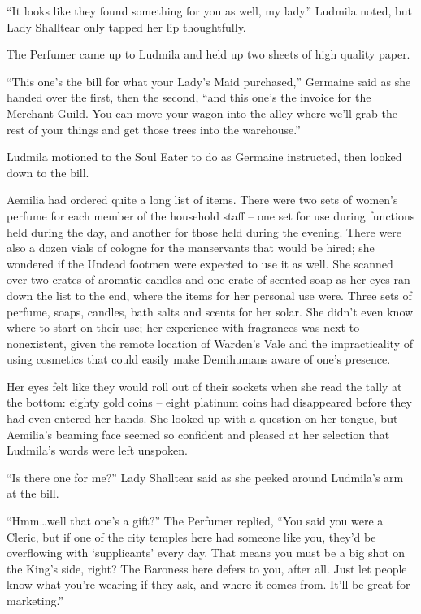  

“It looks like they found something for you as well, my lady.” Ludmila noted, but Lady Shalltear only tapped her lip thoughtfully.

 

The Perfumer came up to Ludmila and held up two sheets of high quality paper.

 

“This one’s the bill for what your Lady’s Maid purchased,” Germaine said as she handed over the first, then the second, “and this one’s the invoice for the Merchant Guild. You can move your wagon into the alley where we’ll grab the rest of your things and get those trees into the warehouse.”

 

Ludmila motioned to the Soul Eater to do as Germaine instructed, then looked down to the bill.

 

Aemilia had ordered quite a long list of items. There were two sets of women’s perfume for each member of the household staff – one set for use during functions held during the day, and another for those held during the evening. There were also a dozen vials of cologne for the manservants that would be hired; she wondered if the Undead footmen were expected to use it as well. She scanned over two crates of aromatic candles and one crate of scented soap as her eyes ran down the list to the end, where the items for her personal use were. Three sets of perfume, soaps, candles, bath salts and scents for her solar. She didn’t even know where to start on their use; her experience with fragrances was next to nonexistent, given the remote location of Warden’s Vale and the impracticality of using cosmetics that could easily make Demihumans aware of one’s presence.

 

Her eyes felt like they would roll out of their sockets when she read the tally at the bottom: eighty gold coins – eight platinum coins had disappeared before they had even entered her hands. She looked up with a question on her tongue, but Aemilia’s beaming face seemed so confident and pleased at her selection that Ludmila’s words were left unspoken.

 

“Is there one for me?” Lady Shalltear said as she peeked around Ludmila’s arm at the bill.

 

“Hmm…well that one’s a gift?” The Perfumer replied, “You said you were a Cleric, but if one of the city temples here had someone like you, they’d be overflowing with ‘supplicants’ every day. That means you must be a big shot on the King’s side, right? The Baroness here defers to you, after all. Just let people know what you’re wearing if they ask, and where it comes from. It’ll be great for marketing.”

